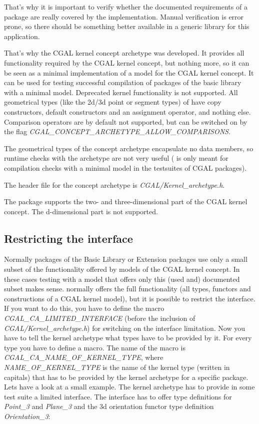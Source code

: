 That's why it is important to verify whether the documented requirements of a
package are really covered by the implementation. Manual verification is error
prone, so there should be something better available in a generic library for
this application.

That's why the CGAL kernel concept archetype  was
developed. It provides all functionality required by the CGAL kernel concept,
but nothing more, so it can be seen as a minimal implementation of a model for
the CGAL kernel concept.  It can be used for testing successful compilation of
packages of the basic library with a minimal model. Deprecated kernel
functionality is not supported. All geometrical types (like the 2d/3d point or
segment types) of  have copy constructors, default
constructors and an assignment operator, and nothing else.  Comparison
operators are by default not supported, but can be switched on by the flag {\em
CGAL\_CONCEPT\_ARCHETYPE\_ALLOW\_COMPARISONS}.

The geometrical types of the concept archetype encapsulate no data members, so
runtime checks with the archetype are not very useful
( is only meant for compilation checks with a
minimal model in the testsuites of CGAL packages).

The header file for the concept archetype is {\em CGAL/Kernel\_archetype.h}.

The package supports the two- and three-dimensional part of the CGAL kernel
concept. The d-dimensional part is not supported.

\subsection{Restricting the interface}

Normally packages of the Basic Library or Extension packages use only a small
subset of the functionality offered by models of the CGAL kernel concept. In
these cases testing with a model that offers only this (used and) documented
subset makes sense.  normally offers the full
functionality (all types, functors and constructions of a CGAL kernel model),
but it is possible to restrict the interface.\\ If you want to do this, you
have to define the macro {\em CGAL\_CA\_LIMITED\_INTERFACE} (before the
inclusion of {\em CGAL/Kernel\_archetype.h}) for switching on the interface
limitation. Now you have to tell the kernel archetype what types have to be
provided by it. For every type you have to define a macro.  The name of the
macro is {\em CGAL\_CA\_NAME\_OF\_KERNEL\_TYPE}, where {\em
NAME\_OF\_KERNEL\_TYPE} is the name of the kernel type (written in capitals)
that has to be provided by the kernel archetype for a specific package.  Lets
have a look at a small example. The kernel archetype has to provide in some
test suite a limited interface.  The interface has to offer type definitions
for {\em Point\_3} and {\em Plane\_3} and the 3d orientation functor type
definition {\em Orientation\_3}:

